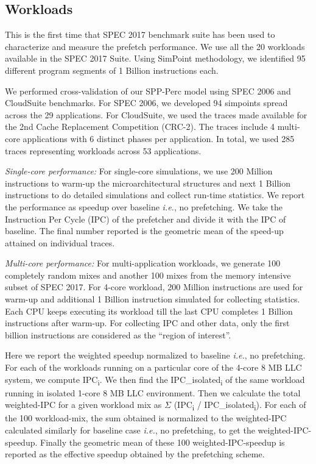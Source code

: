 \subsection{Workloads}
This is the first time that SPEC 2017 benchmark suite\cite{SPEC2017}
has been used to characterize and measure the prefetch performance.
We use all the 20 workloads available in the SPEC 2017 Suite.  Using
SimPoint\cite{SimPoint} methodology, we identified 95 different
program segments of 1 Billion instructions each.

We performed cross-validation of our SPP-Perc model using SPEC
2006\cite{SPEC2006} and CloudSuite\cite{CloudSuite} benchmarks.  For
SPEC 2006, we developed 94 simpoints spread across the 29
applications.  For CloudSuite, we used the traces made available for
the 2nd Cache Replacement Competition (CRC-2)\cite{CRC_2}.  The traces
include 4 multi-core applications with 6 distinct phases per
application.  In total, we used 285 traces representing workloads
across 53 applications.

\textit{Single-core performance:} For single-core simulations, we use
200 Million instructions to warm-up the microarchitectural structures
and next 1 Billion instructions to do detailed simulations and collect
run-time statistics.  We report the performance as speedup over
baseline \textit{i.e.}, no prefetching.  We take the Instruction Per
Cycle (IPC) of the prefetcher and divide it with the IPC of baseline.
The final number reported is the geometric mean of the speed-up
attained on individual traces.

\textit{Multi-core performance:} For multi-application workloads, we
generate 100 completely random mixes and another 100 mixes from the
memory intensive subset of SPEC 2017.  For 4-core workload, 200
Million instructions are used for warm-up and additional 1 Billion
instruction simulated for collecting statistics.  Each CPU keeps
executing its workload till the last CPU completes 1 Billion
instructions after warm-up.  For collecting IPC and other data, only
the first billion instructions are considered as the ``region of
interest''.

Here we report the weighted speedup normalized to baseline
\textit{i.e.}, no prefetching.  For each of the workloads running on a
particular core of the 4-core 8 MB LLC system, we compute
IPC\textsubscript{i}.  We then find the IPC\_isolated\textsubscript{i}
of the same workload running in isolated 1-core 8 MB LLC environment.
Then we calculate the total weighted-IPC for a given workload mix as
$\Sigma$ (IPC\textsubscript{i} / IPC\_isolated\textsubscript{i}).  For
each of the 100 workload-mix, the sum obtained is normalized to the
weighted-IPC calculated similarly for baseline case \textit{i.e.}, no
prefetching, to get the weighted-IPC-speedup.  Finally the geometric
mean of these 100 weighted-IPC-speedup is reported as the effective
speedup obtained by the prefetching scheme.

